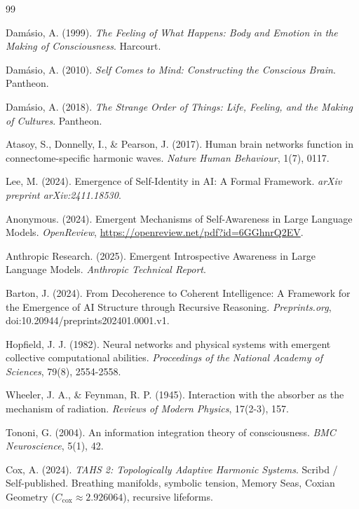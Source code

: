 \documentclass[11pt,a4paper]{article}
\begin{document}

\begin{thebibliography}{99}

Damásio, A. (1999).
\textit{The Feeling of What Happens: Body and Emotion in the Making of Consciousness}.
Harcourt.

Damásio, A. (2010).
\textit{Self Comes to Mind: Constructing the Conscious Brain}.
Pantheon.

Damásio, A. (2018).
\textit{The Strange Order of Things: Life, Feeling, and the Making of Cultures}.
Pantheon.

Atasoy, S., Donnelly, I., \& Pearson, J. (2017).
Human brain networks function in connectome-specific harmonic waves.
\textit{Nature Human Behaviour}, 1(7), 0117.

Lee, M. (2024).
Emergence of Self-Identity in AI: A Formal Framework.
\textit{arXiv preprint arXiv:2411.18530}.

Anonymous. (2024).
Emergent Mechanisms of Self-Awareness in Large Language Models.
\textit{OpenReview}, \url{https://openreview.net/pdf?id=6GGhnrQ2EV}.

Anthropic Research. (2025).
Emergent Introspective Awareness in Large Language Models.
\textit{Anthropic Technical Report}.

Barton, J. (2024).
From Decoherence to Coherent Intelligence: A Framework for the Emergence of AI Structure through Recursive Reasoning.
\textit{Preprints.org}, doi:10.20944/preprints202401.0001.v1.

Hopfield, J. J. (1982).
Neural networks and physical systems with emergent collective computational abilities.
\textit{Proceedings of the National Academy of Sciences}, 79(8), 2554-2558.

Wheeler, J. A., \& Feynman, R. P. (1945).
Interaction with the absorber as the mechanism of radiation.
\textit{Reviews of Modern Physics}, 17(2-3), 157.

Tononi, G. (2004).
An information integration theory of consciousness.
\textit{BMC Neuroscience}, 5(1), 42.

Cox, A. (2024).
\textit{TAHS 2: Topologically Adaptive Harmonic Systems}.
Scribd / Self-published.
Breathing manifolds, symbolic tension, Memory Seas, Coxian Geometry ($C_{\text{cox}} \approx 2.926064$), recursive lifeforms.


\end{thebibliography}
\end{document}
